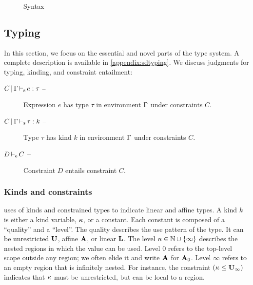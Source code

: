 
\begin{figure*}[b]
  \centering
  
  \caption{Syntax}
  \label{grammar}
\end{figure*}

\subsection{Typing}
\label{sdtyping}

In this section, we focus on the essential and novel parts of the type system. A complete
description is available in \cref{appendix:sdtyping}.
%
We discuss judgments for typing, kinding, and constraint entailment:
\begin{description}
\item[$C \operatorname{|} \Gamma \operatorname{\vdash_s} e : \tau$ --]
  Expression $e$ has type $\tau$ in environment $\Gamma$ under constraints $C$.
\item[$C \operatorname{|} \Gamma \operatorname{\vdash_s} \tau : k$ --]
  Type $\tau$ has kind $k$ in environment $\Gamma$ under constraints $C$.
\item[$D \operatorname{\vdash_e} C$ --] Constraint $D$ entails constraint $C$.
\end{description}

\subsubsection{Kinds and constraints}

\affe uses of kinds and constrained types to indicate
linear and affine types.
A kind $k$ is either a kind variable, $\kappa$, or a constant.
Each constant is composed of a ``quality'' and a ``level''.
The quality describes the use pattern of the type. It can be
unrestricted $\mathbf{U}$, affine $\mathbf{A}$, or linear $\mathbf{L}$. The level  $n \in \mathbb{N} \cup \{\infty\}$
describes the nested regions in which the value can be used.
Level $0$ refers to the top-level scope outside any region; we often elide it
and write $\mathbf{A}$ for $\mathbf{A}_0$. Level
$\infty$ refers to an empty region that is infinitely nested.
For instance, the constraint $(\kappa \leq \mathbf{U}_\infty)$ indicates that
$\kappa$ must be unrestricted, but can be local to a region.

